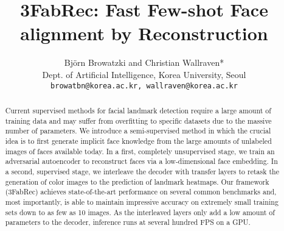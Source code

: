 \documentclass[10pt,twocolumn,letterpaper]{article}
\begin{document}
\author{Bj{\"o}rn Browatzki and Christian Wallraven*\\
Dept. of Artificial Intelligence, Korea University, Seoul\\
{\tt\small browatbn@korea.ac.kr, wallraven@korea.ac.kr}
}

\title{3FabRec: Fast Few-shot Face alignment by Reconstruction}



\begin{abstract}\vspace{-0.35cm}

    Current supervised methods for facial landmark detection require a large amount of training data and may suffer from overfitting to specific datasets due to the massive number of parameters. We introduce a semi-supervised method in which the crucial idea is to first generate implicit face knowledge from the large amounts of unlabeled images of faces available today. In a first, completely unsupervised stage, we train an adversarial autoencoder to reconstruct faces via a low-dimensional face embedding. In a second, supervised stage, we interleave the decoder with transfer layers to retask the generation of color images to the prediction of landmark heatmaps. Our framework (3FabRec) achieves state-of-the-art performance on several common benchmarks and, most importantly, is able to maintain impressive accuracy on extremely small training sets down to as few as 10 images. As the interleaved layers only add a low amount of parameters to the decoder, inference runs at several hundred FPS on a GPU.



\end{abstract}
\end{document}
